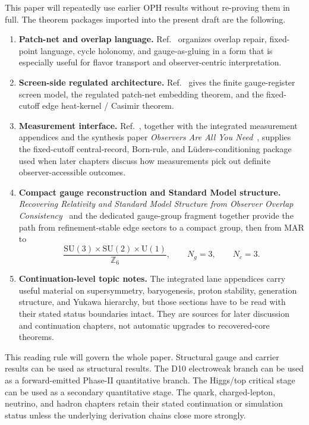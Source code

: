\documentclass[11pt]{article}
\newcommand{\SU}{\mathrm{SU}}
\newcommand{\U}{\mathrm{U}}
\begin{document}
This paper will repeatedly use earlier OPH results without re-proving them in full. The
theorem packages imported into the present draft are the following.

\begin{enumerate}[leftmargin=2em]
\item \textbf{Patch-net and overlap language.} Ref.~\cite{ophconsensus} organizes overlap repair,
fixed-point language, cycle holonomy, and gauge-as-gluing in a form that is especially useful
for flavor transport and observer-centric interpretation.
\item \textbf{Screen-side regulated architecture.} Ref.~\cite{ophmicrophysics} gives the
finite gauge-register screen model, the regulated patch-net embedding theorem, and the fixed-cutoff
edge heat-kernel / Casimir theorem.
\item \textbf{Measurement interface.} Ref.~\cite{ophmicrophysics}, together with the integrated
measurement appendices and the synthesis paper \emph{Observers Are All You Need}~\cite{ophsynthesis}, supplies the fixed-cutoff central-record, Born-rule, and
L\"uders-conditioning package used when later chapters discuss how measurements pick out definite
observer-accessible outcomes.
\item \textbf{Compact gauge reconstruction and Standard Model structure.}
\emph{Recovering Relativity and Standard Model Structure from Observer Overlap Consistency}~\cite{ophcompact}
and the dedicated gauge-group fragment together provide the path from refinement-stable
edge sectors to a compact group, then from MAR to
\[
\frac{\SU(3)\times\SU(2)\times\U(1)}{\mathbb Z_6},
\qquad
N_g=3,
\qquad
N_c=3.
\]
\item \textbf{Continuation-level topic notes.} The integrated lane appendices carry useful material
on supersymmetry, baryogenesis, proton stability, generation structure, and Yukawa hierarchy,
but those sections have to be read with their stated status boundaries intact. They are sources
for later discussion and continuation chapters, not automatic upgrades to recovered-core theorems.
\end{enumerate}

This reading rule will govern the whole paper. Structural gauge and carrier results can be used
as structural results. The D10 electroweak branch can be used as a forward-emitted Phase-II
quantitative branch. The
Higgs/top critical stage can be used as a secondary quantitative stage. The quark,
charged-lepton, neutrino, and hadron chapters retain their stated continuation or
simulation status unless the underlying derivation chains close more strongly.
\end{document}
